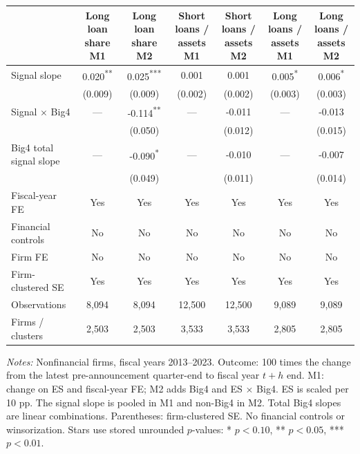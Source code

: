 \documentclass[10pt]{article}
\newcommand{\sym}[1]{\textsuperscript{#1}}
\begin{document}
\begin{minipage}{24cm}\fontsize{10.5}{13}\selectfont\centering
\setlength{\tabcolsep}{4pt}\renewcommand{\arraystretch}{1.12}
\begin{tabular*}{\textwidth}{@{\extracolsep{\fill}}lcccccc@{}}\toprule
 & \shortstack{Long loan share\\M1} & \shortstack{Long loan share\\M2} & \shortstack{Short loans / assets\\M1} & \shortstack{Short loans / assets\\M2} & \shortstack{Long loans / assets\\M1} & \shortstack{Long loans / assets\\M2} \\
\midrule
Signal slope & 0.020\sym{**} & 0.025\sym{***} & 0.001 & 0.001 & 0.005\sym{*} & 0.006\sym{*} \\
 & (0.009) & (0.009) & (0.002) & (0.002) & (0.003) & (0.003) \\
Signal $\times$ Big4 & --- & -0.114\sym{**} & --- & -0.011 & --- & -0.013 \\
 &  & (0.050) &  & (0.012) &  & (0.015) \\
Big4 total signal slope & --- & -0.090\sym{*} & --- & -0.010 & --- & -0.007 \\
 &  & (0.049) &  & (0.011) &  & (0.014) \\
\addlinespace
Fiscal-year FE & Yes & Yes & Yes & Yes & Yes & Yes \\
Financial controls & No & No & No & No & No & No \\
Firm FE & No & No & No & No & No & No \\
Firm-clustered SE & Yes & Yes & Yes & Yes & Yes & Yes \\
Observations & 8,094 & 8,094 & 12,500 & 12,500 & 9,089 & 9,089 \\
Firms / clusters & 2,503 & 2,503 & 3,533 & 3,533 & 2,805 & 2,805 \\
\bottomrule\end{tabular*}
\par\medskip\raggedright\fontsize{9}{11}\selectfont
\textit{Notes:} Nonfinancial firms, fiscal years 2013--2023. Outcome: 100 times the change from the latest pre-announcement quarter-end to fiscal year $t+h$ end. M1: change on ES and fiscal-year FE; M2 adds Big4 and ES $\times$ Big4. ES is scaled per 10 pp. The signal slope is pooled in M1 and non-Big4 in M2. Total Big4 slopes are linear combinations. Parentheses: firm-clustered SE. No financial controls or winsorization. Stars use stored unrounded $p$-values: * $p<0.10$, ** $p<0.05$, *** $p<0.01$.
\end{minipage}
\end{document}
